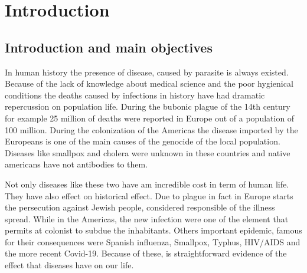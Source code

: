 \part{Introduction}

\chapter{Introduction and main objectives}
In human history the presence of disease, caused by parasite is always existed. 
Because of the lack of knowledge about medical science and the poor hygienical conditions the deaths caused by infections in history  have had dramatic repercussion on population life. During the bubonic plague of the 14th century for example 25 million of deaths were reported in Europe out of a population of 100 million. 
During the colonization of the Americas the disease imported by the Europeans is one of the main causes of the genocide of the local population. Diseases like smallpox and cholera were unknown in these countries and native americans have not antibodies to them. 



Not only diseases like these two have am incredible cost in term of human life. They have also effect on historical effect. Due to plague in fact in Europe starts the persecution against Jewish people, considered responsible of the illness spread. While in the Americas, the new infection were one of the element that permits at colonist to subdue the inhabitants. 
Others important epidemic, famous for their consequences were Spanish influenza, Smallpox, Typhus, HIV/AIDS and the more recent Covid-19. 
Because of these, is straightforward evidence of the effect that diseases have on our life.

